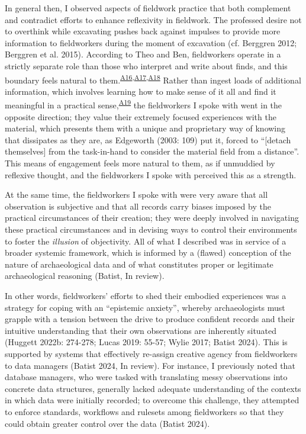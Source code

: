 \documentclass[
]{article}
\begin{document}
In general then, I observed aspects of fieldwork practice that both
complement and contradict efforts to enhance reflexivity in fieldwork.
The professed desire not to overthink while excavating pushes back
against impulses to provide more information to fieldworkers during the
moment of excavation (cf. Berggren 2012; Berggren et al. 2015).
According to Theo and Ben, fieldworkers operate in a strictly separate
role than those who interpret and write about finds, and this boundary
feels natural to
them.\textsuperscript{\hyperref[sec-A16]{A16},\hyperref[sec-A17]{A17},\hyperref[sec-A18]{A18}}
Rather than ingest loads of additional information, which involves
learning how to make sense of it all and find it meaningful in a
practical sense,\textsuperscript{\hyperref[sec-A19]{A19}} the
fieldworkers I spoke with went in the opposite direction; they value
their extremely focused experiences with the material, which presents
them with a unique and proprietary way of knowing that dissipates as
they are, as Edgeworth (2003: 109) put it, forced to ``{[}detach
themselves{]} from the task-in-hand to consider the material field from
a distance''. This means of engagement feels more natural to them, as if
unmuddied by reflexive thought, and the fieldworkers I spoke with
perceived this as a strength.

At the same time, the fieldworkers I spoke with were very aware that all
observation is subjective and that all records carry biases imposed by
the practical circumstances of their creation; they were deeply involved
in navigating these practical circumstances and in devising ways to
control their environments to foster the \emph{illusion} of objectivity.
All of what I described was in service of a broader systemic framework,
which is informed by a (flawed) conception of the nature of
archaeological data and of what constitutes proper or legitimate
archaeological reasoning (Batist, In review).

In other words, fieldworkers' efforts to shed their embodied experiences
was a strategy for coping with an ``epistemic anxiety'', whereby
archaeologists must grapple with a tension between the drive to produce
confident records and their intuitive understanding that their own
observations are inherently situated (Huggett 2022b: 274-278; Lucas
2019: 55-57; Wylie 2017; Batist 2024). This is supported by systems that
effectively re-assign creative agency from fieldworkers to data managers
(Batist 2024, In review). For instance, I previously noted that database
managers, who were tasked with translating messy observations into
concrete data structures, generally lacked adequate understanding of the
contexts in which data were initially recorded; to overcome this
challenge, they attempted to enforce standards, workflows and rulesets
among fieldworkers so that they could obtain greater control over the
data (Batist 2024).
\end{document}
